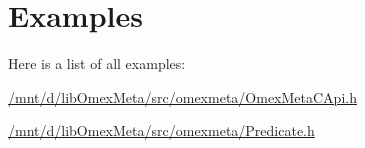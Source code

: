 \section{Examples}
Here is a list of all examples\+:\begin{DoxyCompactItemize}
\item 
\hyperlink{_2mnt_2d_2libOmexMeta_2src_2omexmeta_2OmexMetaCApi_8h-example}{/mnt/d/lib\+Omex\+Meta/src/omexmeta/\+Omex\+Meta\+C\+Api.\+h}
\item 
\hyperlink{_2mnt_2d_2libOmexMeta_2src_2omexmeta_2Predicate_8h-example}{/mnt/d/lib\+Omex\+Meta/src/omexmeta/\+Predicate.\+h}
\end{DoxyCompactItemize}

